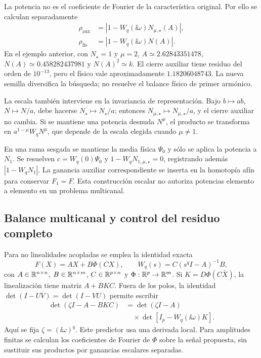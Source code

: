 La potencia no es el coeficiente de Fourier de la característica
original. Por ello se calculan separadamente
\begin{equation}
 \begin{aligned}
 \rho_{\mathrm{aux}}&=|1-W_q(\ii\omega)N_{\mu,\star}(A)|,\\
 \rho_{\mathrm{fis}}&=|1-W_q(\ii\omega)N(A)|.
 \end{aligned}
 \label{bre:bal:machado-residuals}
\end{equation}
En el ejemplo anterior, con \(N_\star=1\) y \(\mu=2\),
\(A\simeq2.62843351478\), \(N(A)\simeq0.458282437981\) y
\(N(A)^2\simeq k\). El cierre auxiliar tiene residuo del orden de
\(10^{-13}\), pero el físico vale aproximadamente \(1.18206048743\).
La nueva semilla diversifica la búsqueda; no resuelve el balance físico
de primer armónico.

La escala también interviene en la invariancia de representación. Bajo
\(b\mapsto ab\), \(N\mapsto N/a\), debe hacerse
\(N_\star\mapsto N_\star/a\); entonces
\(N_{\mu,\star}\mapsto N_{\mu,\star}/a\), y el cierre auxiliar no
cambia. Si se mantiene una potencia desnuda \(N^\mu\), el producto
se transforma en \(a^{1-\mu}W_qN^\mu\), que depende de la escala
elegida cuando \(\mu\ne1\).

En una rama sesgada se mantiene la media física \(\Psi_0\) y sólo
se aplica la potencia a \(N_1\). Se resuelven
\(c=W_q(0)\Psi_0\) y
\(1-W_qN_{1,\mu,\star}=0\), registrando además
\(|1-W_qN_1|\). La ganancia auxiliar correspondiente se inserta en
la homotopía afín para conservar \(F_1=F\). Esta construcción escalar
no autoriza potencias elemento a elemento en un problema multicanal.

\subsection{Balance multicanal y control del residuo completo}
\label{bre:bal:mimo}

Para no linealidades acopladas se emplea la identidad exacta
\begin{equation}
 F(X)=AX+B\Phi(CX),\qquad
 W_q(s)=C(s^qI-A)^{-1}B,
 \label{bre:bal:mimo-model}
\end{equation}
con \(A\in\mathbb R^{n\times n}\), \(B\in\mathbb R^{n\times m}\),
\(C\in\mathbb R^{p\times n}\) y \(\Phi:\mathbb R^p\to\mathbb R^m\).
Si \(K=D\Phi(C\bar X)\), la linealización tiene matriz
\(A+BKC\). Fuera de los polos, la identidad
\(\det(I-UV)=\det(I-VU)\) permite escribir
\begin{equation}
 \begin{aligned}
 \det(\zeta I-A-BKC)
 &=\det(\zeta I-A)\\
 &\quad\times\det[I_p-W_q(\ii\omega)K].
 \end{aligned}
 \label{bre:bal:mimo-linear}
\end{equation}
Aquí se fija $\zeta=(\ii\omega)^q$. Este predictor usa una derivada local.
Para amplitudes finitas se
calculan los coeficientes de Fourier de \(\Phi\) sobre la señal
propuesta, sin sustituir sus productos por ganancias escalares separadas.


